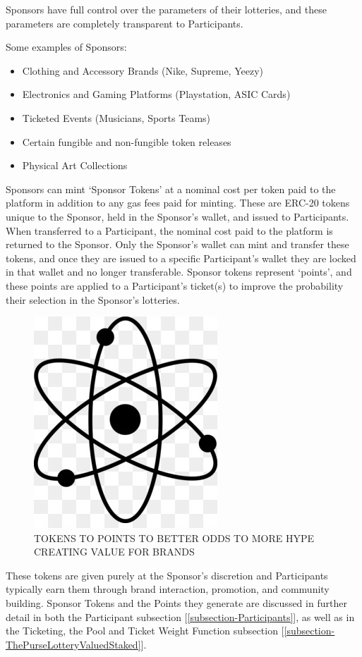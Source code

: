 \documentclass[runningheads]{llncs}
\begin{document}
Sponsors have full control over the parameters of their lotteries, and these parameters are completely transparent to Participants.  

Some examples of Sponsors:
\begin{itemize}
\item Clothing and Accessory Brands (Nike, Supreme, Yeezy)
\item Electronics and Gaming Platforms (Playstation, ASIC Cards)
\item Ticketed Events (Musicians, Sports Teams)
\item Certain fungible and non-fungible token releases
\item Physical Art Collections
\end{itemize}

Sponsors can mint ‘Sponsor Tokens’ at a nominal cost per token paid to the platform in addition to any gas fees paid for minting.  These are ERC-20 tokens unique to the Sponsor, held in the Sponsor’s wallet, and issued to Participants.  When transferred to a Participant, the nominal cost paid to the platform is returned to the Sponsor.  Only the Sponsor’s wallet can mint and transfer these tokens, and once they are issued to a specific Participant’s wallet they are locked in that wallet and no longer transferable.  Sponsor tokens represent ‘points’, and these points are applied to a Participant’s ticket(s) to improve the probability their selection in the Sponsor’s lotteries.  

\begin{figure}[H]
\centering
\includegraphics[scale=0.5]{Figures_and_Tables/atom.png}
\caption{TOKENS TO POINTS TO BETTER ODDS TO MORE HYPE CREATING VALUE FOR BRANDS}
\end{figure}

These tokens are given purely at the Sponsor’s discretion and Participants typically earn them through brand interaction, promotion, and community building.  Sponsor Tokens and the Points they generate are discussed in further detail in both the Participant subsection [\ref{subsection-Participants}], as well as in the Ticketing, the Pool and Ticket Weight Function subsection [\ref{subsection-ThePurseLotteryValuedStaked}].
\end{document}
